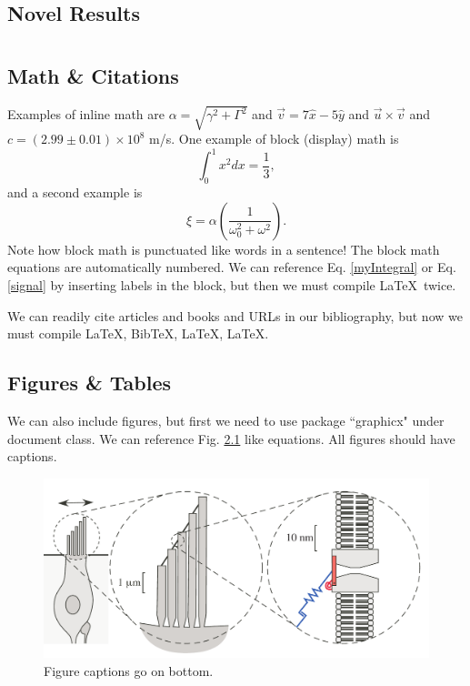 \documentclass{book}
\begin{document}
\section{Novel Results}

\chapter{}

\section{Math \& Citations}	%
Examples of inline math are $\alpha = \sqrt{\gamma^2 + \Gamma^2}$ and $\vec{v} = 7 \hat{x} - 5 \hat{y}$ and $\vec u \times \vec v$ and $c = (2.99 \pm 0.01) \times 10^8$ m/s. One example of block (display) math is
%
\begin{equation}
	\int_0^1x^2 dx = \frac{1}{3},
	\label{myIntegral}
\end{equation}
%
and a second example is
%
\begin{equation}
	\xi = \alpha \left( \frac{1}{ \omega_0^2 + \omega^2 } \right).
	\label{signal}
\end{equation}
%
Note how block math is punctuated like words in a sentence! The block math equations are automatically numbered. We can reference Eq. \ref{myIntegral} or Eq. \ref{signal} by inserting labels in the block, but then we must compile \LaTeX\ twice.

We can readily cite articles \cite{Chenciner2000}  and books \cite{Gleick1987} and URLs \cite{Lindner2015} in our bibliography, but now we must compile \LaTeX, Bib\TeX,  \LaTeX, \LaTeX.

\section{Figures \& Tables}
We can also include figures, but first we need to use package ``graphicx" under document class. We can reference Fig. \ref{SchematicDiagram} like equations. All figures should have captions.

\begin{figure}[ht] %
	\begin{center}
		\includegraphics[width=0.8\linewidth]{Figures/ExampleFigure} %
		\caption{Figure captions go on bottom.}
		\label{SchematicDiagram}
	\end{center}
\end{figure}
\end{document}
